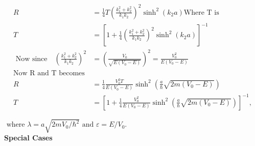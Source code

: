	$$
	\begin{aligned}
	R&=\frac{1}{4} T\left(\frac{k_{1}^{2}+k_{2}^{2}}{k_{1} k_{2}}\right)^{2} \sinh ^{2}\left(k_{2} a\right) 
	\text{Where T is }\\
	T&=\left[1+\frac{1}{4}\left(\frac{k_{1}^{2}+k_{2}^{2}}{k_{1} k_{2}}\right)^{2} \sinh ^{2}\left(k_{2} a\right)\right]^{-1} \\
\text{	Now since}\quad
	\left(\frac{k_{1}^{2}+k_{2}^{2}}{k_{1} k_{2}}\right)^{2}&=\left(\frac{V_{0}}{\sqrt{E\left(V_{0}-E\right)}}\right)^{2}=\frac{V_{0}^{2}}{E\left(V_{0}-E\right)}\\
	\text{Now R and T becomes}\\
	R &=\frac{1}{4} \frac{V_{0}^{2} T}{E\left(V_{0}-E\right)} \sinh ^{2}\left(\frac{a}{\hbar} \sqrt{2 m\left(V_{0}-E\right)}\right) \\
	T &=\left[1+\frac{1}{4} \frac{V_{0}^{2}}{E\left(V_{0}-E\right)} \sinh ^{2}\left(\frac{a}{\hbar} \sqrt{2 m\left(V_{0}-E\right)}\right)\right]^{-1},
\end{aligned}$$
\begin{center}
\end{center}
$\text { where } \lambda=a \sqrt{2 m V_{0} / \hbar^{2}} \text { and } \varepsilon=E / V_{0} \text {. }$\\
\textbf{Special Cases}
